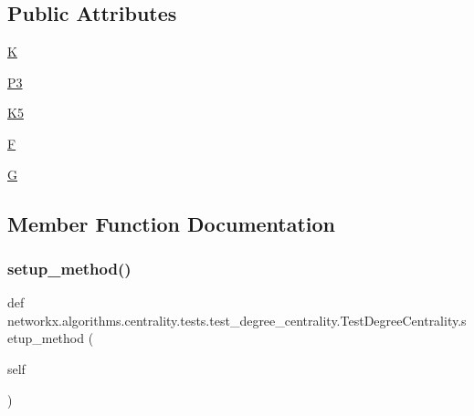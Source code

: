 \subsection*{Public Attributes}
\begin{DoxyCompactItemize}
\item 
\hyperlink{classnetworkx_1_1algorithms_1_1centrality_1_1tests_1_1test__degree__centrality_1_1TestDegreeCentrality_a1874bfb51e88d54c860103178ffa1c74}{K}
\item 
\hyperlink{classnetworkx_1_1algorithms_1_1centrality_1_1tests_1_1test__degree__centrality_1_1TestDegreeCentrality_ad38006ce48e17668dd82566cb313525e}{P3}
\item 
\hyperlink{classnetworkx_1_1algorithms_1_1centrality_1_1tests_1_1test__degree__centrality_1_1TestDegreeCentrality_a683b9c5571c9555ac33145a1b5262fb5}{K5}
\item 
\hyperlink{classnetworkx_1_1algorithms_1_1centrality_1_1tests_1_1test__degree__centrality_1_1TestDegreeCentrality_a83cf66b7468389c8866deb81c9918aa5}{F}
\item 
\hyperlink{classnetworkx_1_1algorithms_1_1centrality_1_1tests_1_1test__degree__centrality_1_1TestDegreeCentrality_a828a51eb3ebf9a478c54c6caca66eb40}{G}
\end{DoxyCompactItemize}


\subsection{Member Function Documentation}
\mbox{\label{classnetworkx_1_1algorithms_1_1centrality_1_1tests_1_1test__degree__centrality_1_1TestDegreeCentrality_aa9bcbbf29dd30e6c5e3864a1fbe7b67d}} 
\subsubsection{\texorpdfstring{setup\+\_\+method()}{setup\_method()}}
{\footnotesize\ttfamily def networkx.\+algorithms.\+centrality.\+tests.\+test\+\_\+degree\+\_\+centrality.\+Test\+Degree\+Centrality.\+setup\+\_\+method (\begin{DoxyParamCaption}\item[{}]{self }\end{DoxyParamCaption})}


